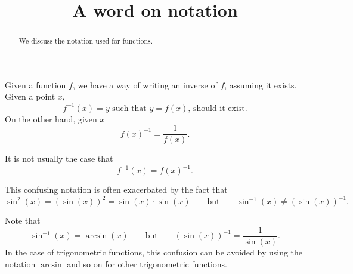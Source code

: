\documentclass{ximera}
\title{A word on notation}
\begin{document}
\begin{abstract}
  We discuss the notation used for functions.
\end{abstract}
\maketitle

Given a function $f$, we have a way of writing an inverse of $f$,
assuming it exists. Given a point $x$, 
\[
f^{-1}(x) = \text{$y$ such that $y = f(x)$, should it exist.}
\]
On the other hand, given $x$
\[
f(x)^{-1} = \frac{1}{f(x)}.
\]
\begin{warning}
It is not usually the case that 
\[
f^{-1}(x) = f(x)^{-1}.
\]
\end{warning}

This confusing notation is often exacerbated by the fact that 
\[
\sin^2(x) = (\sin(x))^2=\sin(x)\cdot \sin(x)\qquad \text{but} \qquad \sin^{-1}(x)
\ne(\sin(x))^{-1}.
\]

\begin{warning}
  Note that 
  \[
  \sin^{-1}(x)=\arcsin(x)\qquad\text{but}\qquad (\sin(x))^{-1} = \frac
  {1}{\sin(x)}.
  \]
  In the case of trigonometric functions, this confusion can be avoided
  by using the notation $\arcsin$ and so on for other trigonometric
  functions.
\end{warning}
\end{document}
